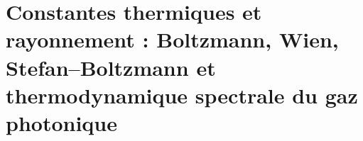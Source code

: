 \chapter{Constantes thermiques et rayonnement : Boltzmann, Wien, Stefan--Boltzmann et thermodynamique spectrale du gaz photonique}
\label{chap:p3-final:48:constantes_termicas}

